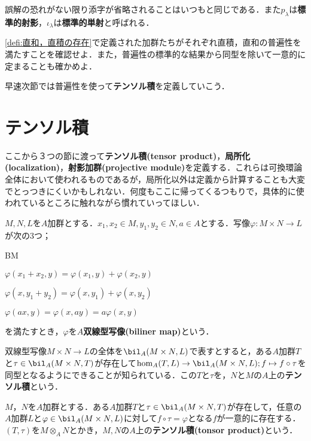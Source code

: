 誤解の恐れがない限り添字が省略されることはいつもと同じである．また$p_\lambda$は\textbf{標準的射影}，$\iota_\lambda$は\textbf{標準的単射}と呼ばれる．

\begin{exer}
\ref{defi:直和，直積の存在}で定義された加群たちがそれぞれ直積，直和の普遍性を満たすことを確認せよ．また，普遍性の標準的な結果から同型を除いて一意的に定まることも確かめよ．
\end{exer}

早速次節では普遍性を使って\textbf{テンソル積}を定義していこう．

\section{テンソル積}

ここから３つの節に渡って\textbf{テンソル積(tensor product)}，\textbf{局所化(localization)}，\textbf{射影加群(projective module)}を定義する．これらは可換環論全体において使われるものであるが，局所化以外は定義から計算することも大変でとっつきにくいかもしれない．何度もここに帰ってくるつもりで，具体的に使われているところに触れながら慣れていってほしい．
\begin{defi}[双線型写像]
	$M,N,L$を$A$加群とする．$x_1,x_2\in M,y_1,y_2\in N,a\in A$とする．写像$\varphi:M\times N\to L$が次の3つ；
	\begin{defiterm}{BM}
		\item $\varphi(x_1+x_2,y)=\varphi(x_1,y)+\varphi(x_2,y)$
		\item $\varphi(x,y_1+y_2)=\varphi(x,y_1)+\varphi(x,y_2)$
		\item $\varphi(ax,y)=\varphi(x,ay)=a\varphi(x,y)$
	\end{defiterm}
	を満たすとき，$\varphi$を$A$\textbf{双線型写像(biliner map)}という．
\end{defi}

双線型写像$M\times N\to L$の全体を$\bil_A(M\times N, L)$で表すとすると，ある$A$加群$T$と$\tau\in\bil_A(M\times N, T)$が存在して$\hom_A(T,L)\to\bil_A(M\times N, L);f\mapsto f\circ\tau$を同型となるようにできることが知られている．この$T$と$\tau$を，$N$と$M$の$A$上の\textbf{テンソル積}という．

\begin{defi}[テンソル積]
	$M，N$を$A$加群とする．ある$A$加群$T$と$\tau\in\bil_A(M\times N, T)$が存在して，任意の$A$加群$L$と$\varphi\in\bil_A(M\times N, L)$に対して$f\circ\tau=\varphi$となる$f$が一意的に存在する．$(T,\tau)$を$M\otimes_A N$とかき，$M,N$の$A$上の\textbf{テンソル積(tonsor product)}という．
\end{defi}


